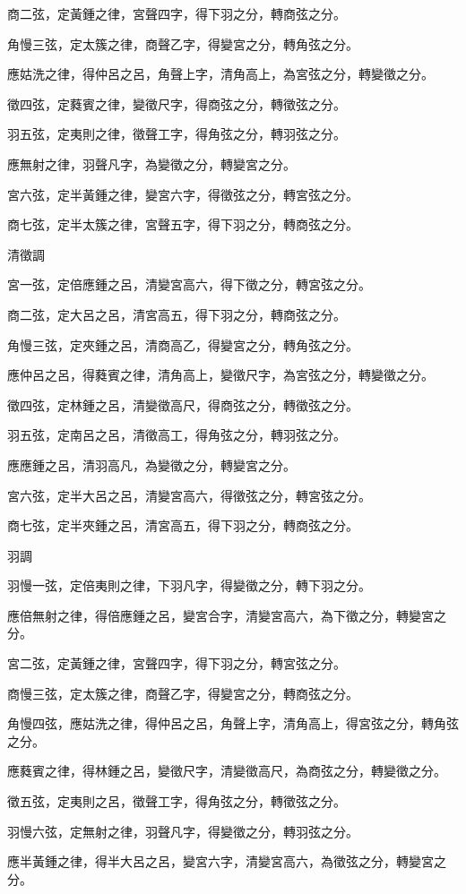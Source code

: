 \begin{pinyinscope}
商二弦，定黃鍾之律，宮聲四字，得下羽之分，轉商弦之分。

角慢三弦，定太簇之律，商聲乙字，得變宮之分，轉角弦之分。

應姑洗之律，得仲呂之呂，角聲上字，清角高上，為宮弦之分，轉變徵之分。

徵四弦，定蕤賓之律，變徵尺字，得商弦之分，轉徵弦之分。

羽五弦，定夷則之律，徵聲工字，得角弦之分，轉羽弦之分。

應無射之律，羽聲凡字，為變徵之分，轉變宮之分。

宮六弦，定半黃鍾之律，變宮六字，得徵弦之分，轉宮弦之分。

商七弦，定半太簇之律，宮聲五字，得下羽之分，轉商弦之分。

清徵調

宮一弦，定倍應鍾之呂，清變宮高六，得下徵之分，轉宮弦之分。

商二弦，定大呂之呂，清宮高五，得下羽之分，轉商弦之分。

角慢三弦，定夾鍾之呂，清商高乙，得變宮之分，轉角弦之分。

應仲呂之呂，得蕤賓之律，清角高上，變徵尺字，為宮弦之分，轉變徵之分。

徵四弦，定林鍾之呂，清變徵高尺，得商弦之分，轉徵弦之分。

羽五弦，定南呂之呂，清徵高工，得角弦之分，轉羽弦之分。

應應鍾之呂，清羽高凡，為變徵之分，轉變宮之分。

宮六弦，定半大呂之呂，清變宮高六，得徵弦之分，轉宮弦之分。

商七弦，定半夾鍾之呂，清宮高五，得下羽之分，轉商弦之分。

羽調

羽慢一弦，定倍夷則之律，下羽凡字，得變徵之分，轉下羽之分。

應倍無射之律，得倍應鍾之呂，變宮合字，清變宮高六，為下徵之分，轉變宮之分。

宮二弦，定黃鍾之律，宮聲四字，得下羽之分，轉宮弦之分。

商慢三弦，定太簇之律，商聲乙字，得變宮之分，轉商弦之分。

角慢四弦，應姑洗之律，得仲呂之呂，角聲上字，清角高上，得宮弦之分，轉角弦之分。

應蕤賓之律，得林鍾之呂，變徵尺字，清變徵高尺，為商弦之分，轉變徵之分。

徵五弦，定夷則之呂，徵聲工字，得角弦之分，轉徵弦之分。

羽慢六弦，定無射之律，羽聲凡字，得變徵之分，轉羽弦之分。

應半黃鍾之律，得半大呂之呂，變宮六字，清變宮高六，為徵弦之分，轉變宮之分。


\end{pinyinscope}
